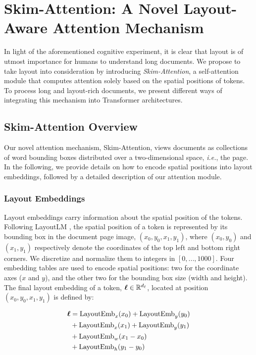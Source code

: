 \section{Skim-Attention: A Novel Layout-Aware Attention Mechanism}

In light of the aforementioned cognitive experiment, it is clear that layout is of utmost importance for humans to understand long documents. We propose to take layout into consideration by introducing \emph{Skim-Attention}, a self-attention module that computes attention solely based on the spatial positions of tokens. To process long and layout-rich documents, we present different ways of integrating this mechanism into Transformer architectures.

\subsection{Skim-Attention Overview}

Our novel attention mechanism, Skim-Attention, views documents as collections of word bounding boxes distributed over a two-dimensional space, \textit{i.e.}, the page. In the following, we provide details on how to encode spatial positions into layout embeddings, followed by a detailed description of our attention module.

\subsubsection{Layout Embeddings}

Layout embeddings carry information about the spatial position of the tokens. Following LayoutLM \citep{xu2020layoutlm}, the spatial position of a token is represented by its bounding box in the document page image, $(x_0, y_0, x_1, y_1)$, where $(x_0, y_0)$ and $(x_1, y_1)$ respectively denote the coordinates of the top left and bottom right corners. We discretize and normalize them to integers in $[0, ..., 1000]$. Four embedding tables are used to encode spatial positions: two for the coordinate axes ($x$ and $y$), and the other two for the bounding box size (width and height). The final layout embedding of a token, $\boldsymbol{\ell} \in \mathbb{R}^{d_{\ell}}$, located at position $(x_0, y_0, x_1, y_1)$ is defined by:
\vspace{-0.5cm}

\begin{equation}
\begin{split}
    \boldsymbol{\ell} & = \text{LayoutEmb}_x(x_0) + \text{LayoutEmb}_y(y_0) \\
    & + \text{LayoutEmb}_x(x_1) + \text{LayoutEmb}_y(y_1) \\
    & + \text{LayoutEmb}_w(x_1 - x_0) \\
    & + \text{LayoutEmb}_h(y_1 - y_0) \\
\end{split}
\end{equation}

